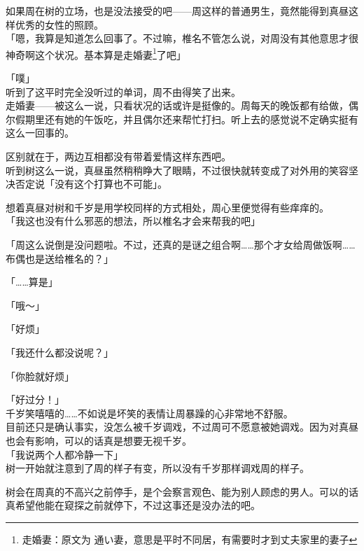 如果周在树的立场，也是没法接受的吧——周这样的普通男生，竟然能得到真昼这样优秀的女性的照顾。\\

「嗯，我算是知道怎么回事了。不过嘛，椎名不管怎么说，对周没有其他意思才很神奇啊这个状况。基本算是走婚妻\footnote{走婚妻：原文为 {\jpfont 通い妻}，意思是平时不同居，有需要时才到丈夫家里的妻子}了吧」

「噗」\\

听到了这平时完全没听过的单词，周不由得笑了出来。\\

走婚妻——被这么一说，只看状况的话或许是挺像的。周每天的晚饭都有给做，偶尔假期里还有她的午饭吃，并且偶尔还来帮忙打扫。听上去的感觉说不定确实挺有这么一回事的。

区别就在于，两边互相都没有带着爱情这样东西吧。\\

听到树这么一说，真昼虽然稍稍睁大了眼睛，不过很快就转变成了对外用的笑容坚决否定说「没有这个打算也不可能」。

想着真昼对树和千岁是用学校同样的方式相处，周心里便觉得有些痒痒的。\\

「我这也没有什么邪恶的想法，所以椎名才会来帮我的吧」

「周这么说倒是没问题啦。不过，还真的是谜之组合啊……那个才女给周做饭啊……布偶也是送给椎名的？」

「……算是」

「哦～」

「好烦」

「我还什么都没说呢？」

「你脸就好烦」

「好过分！」\\

千岁笑嘻嘻的……不如说是坏笑的表情让周暴躁的心非常地不舒服。\\

目前还只是确认事实，没怎么被千岁调戏，不过周可不愿意被她调戏。因为对真昼也会有影响，可以的话真是想要无视千岁。\\

「我说两个人都冷静一下」\\

树一开始就注意到了周的样子有变，所以没有千岁那样调戏周的样子。

树会在周真的不高兴之前停手，是个会察言观色、能为别人顾虑的男人。可以的话真希望他能在窥探之前就停下，不过这事还是没办法的吧。\\

